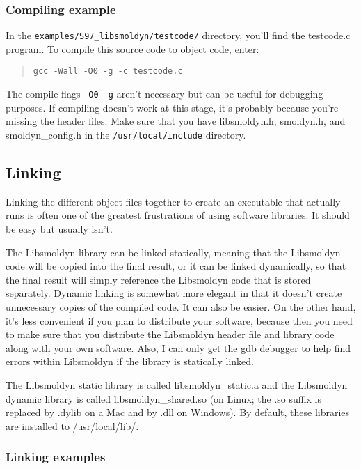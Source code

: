 \documentclass {scrbook}
\newcommand {\ttt} {\texttt}
\begin{document}
\subsubsection*{Compiling example}
In the \ttt{examples/S97\_libsmoldyn/testcode/} directory, you'll find the testcode.c program. To compile this source code to object code, enter:

\begin{quote}
\lstinline{gcc -Wall -O0 -g -c testcode.c}
\end{quote}

The compile flags \ttt{-O0 -g} aren't necessary but can be useful for debugging purposes. If compiling doesn't work at this stage, it's probably because you're missing the header files. Make sure that you have libsmoldyn.h, smoldyn.h, and smoldyn\_config.h in the \ttt{/usr/local/include} directory.

\subsection*{Linking}

Linking the different object files together to create an executable that actually runs is often one of the greatest frustrations of using software libraries. It should be easy but usually isn't.

The Libsmoldyn library can be linked statically, meaning that the Libsmoldyn code will be copied into the final result, or it can be linked dynamically, so that the final result will simply reference the Libsmoldyn code that is stored separately. Dynamic linking is somewhat more elegant in that it doesn't create unnecessary copies of the compiled code. It can also be easier. On the other hand, it's less convenient if you plan to distribute your software, because then you need to make sure that you distribute the Libsmoldyn header file and library code along with your own software. Also, I can only get the gdb debugger to help find errors within Libsmoldyn if the library is statically linked.

The Libsmoldyn static library is called libsmoldyn\_static.a and the Libsmoldyn dynamic library is called libsmoldyn\_shared.so (on Linux; the .so suffix is replaced by .dylib on a Mac and by .dll on Windows). By default, these libraries are installed to /usr/local/lib/.

\subsubsection*{Linking examples}
\end{document}
